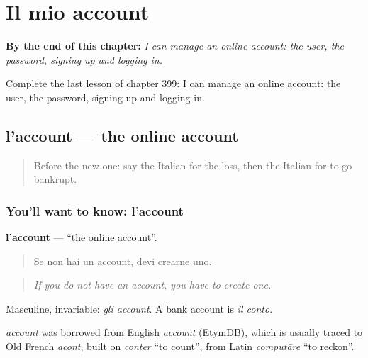 
\chapter{Il mio account}
\label{ch:it-il-mio-account}

\begin{chapteropening}
\textbf{By the end of this chapter:} \emph{I can manage an online account: the user, the password, signing up and logging in.}

Complete the last lesson of chapter 399: I can manage an online account: the user, the password, signing up and logging in.
\end{chapteropening}

\section[l'account]{l'account — the online account}

\label{lesson:IT-C399-account}



\begin{quote}
Before the new one: say the Italian for the loss, then the Italian for to go bankrupt.
\end{quote}

\subsection*{You'll want to know: l'account}
\textbf{l'account} — \textquotedblleft{}the online account\textquotedblright{}.

\begin{quote}
Se non hai un account, devi crearne uno.
\end{quote}

\begin{quote}
\emph{If you do not have an account, you have to create one.}
\end{quote}

Masculine, invariable: \emph{gli account}. A bank account is \emph{il conto}.

\begin{cousinweb}
\emph{account} was borrowed from English \emph{account} (EtymDB), which is usually traced to Old French \emph{acont}, built on \emph{conter} \textquotedblleft{}to count\textquotedblright{}, from Latin \emph{computāre} \textquotedblleft{}to reckon\textquotedblright{}.
\end{cousinweb}

